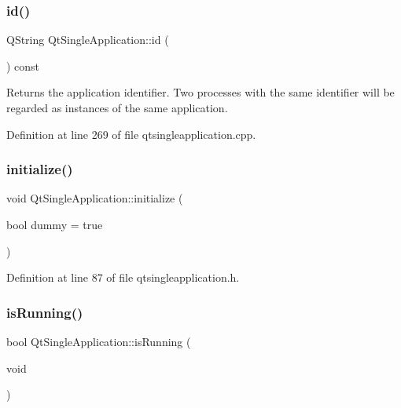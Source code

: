 \mbox{\label{class_qt_single_application_a025290493ba51d3eba54d0041502a380}} 
\subsubsection{\texorpdfstring{id()}{id()}}
{\footnotesize\ttfamily Q\+String Qt\+Single\+Application\+::id (\begin{DoxyParamCaption}{ }\end{DoxyParamCaption}) const}

Returns the application identifier. Two processes with the same identifier will be regarded as instances of the same application. 

Definition at line 269 of file qtsingleapplication.\+cpp.

\mbox{\label{class_qt_single_application_a622807c60657c1a1fadec15ea5903b47}} 
\subsubsection{\texorpdfstring{initialize()}{initialize()}}
{\footnotesize\ttfamily void Qt\+Single\+Application\+::initialize (\begin{DoxyParamCaption}\item[{bool}]{dummy = {\ttfamily true} }\end{DoxyParamCaption})\hspace{0.3cm}{\ttfamily [inline]}}



Definition at line 87 of file qtsingleapplication.\+h.

\mbox{\label{class_qt_single_application_aa9f0e6e4f18ac79bbb7a955cd860894d}} 
\subsubsection{\texorpdfstring{is\+Running()}{isRunning()}}
{\footnotesize\ttfamily bool Qt\+Single\+Application\+::is\+Running (\begin{DoxyParamCaption}\item[{void}]{ }\end{DoxyParamCaption})}

